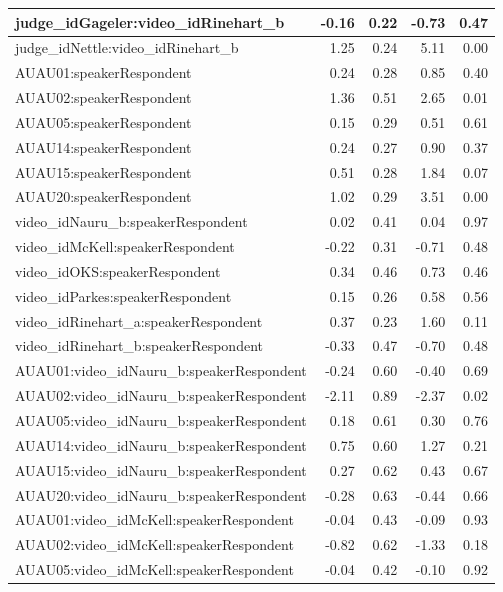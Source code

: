 \documentclass{monashthesis}
\begin{document}
\begin{tabular}{l|r|r|r|r}
\hline
judge\_idGageler:video\_idRinehart\_b & -0.16 & 0.22 & -0.73 & 0.47\\
\hline
judge\_idNettle:video\_idRinehart\_b & 1.25 & 0.24 & 5.11 & 0.00\\
\hline
AUAU01:speakerRespondent & 0.24 & 0.28 & 0.85 & 0.40\\
\hline
AUAU02:speakerRespondent & 1.36 & 0.51 & 2.65 & 0.01\\
\hline
AUAU05:speakerRespondent & 0.15 & 0.29 & 0.51 & 0.61\\
\hline
AUAU14:speakerRespondent & 0.24 & 0.27 & 0.90 & 0.37\\
\hline
AUAU15:speakerRespondent & 0.51 & 0.28 & 1.84 & 0.07\\
\hline
AUAU20:speakerRespondent & 1.02 & 0.29 & 3.51 & 0.00\\
\hline
video\_idNauru\_b:speakerRespondent & 0.02 & 0.41 & 0.04 & 0.97\\
\hline
video\_idMcKell:speakerRespondent & -0.22 & 0.31 & -0.71 & 0.48\\
\hline
video\_idOKS:speakerRespondent & 0.34 & 0.46 & 0.73 & 0.46\\
\hline
video\_idParkes:speakerRespondent & 0.15 & 0.26 & 0.58 & 0.56\\
\hline
video\_idRinehart\_a:speakerRespondent & 0.37 & 0.23 & 1.60 & 0.11\\
\hline
video\_idRinehart\_b:speakerRespondent & -0.33 & 0.47 & -0.70 & 0.48\\
\hline
AUAU01:video\_idNauru\_b:speakerRespondent & -0.24 & 0.60 & -0.40 & 0.69\\
\hline
AUAU02:video\_idNauru\_b:speakerRespondent & -2.11 & 0.89 & -2.37 & 0.02\\
\hline
AUAU05:video\_idNauru\_b:speakerRespondent & 0.18 & 0.61 & 0.30 & 0.76\\
\hline
AUAU14:video\_idNauru\_b:speakerRespondent & 0.75 & 0.60 & 1.27 & 0.21\\
\hline
AUAU15:video\_idNauru\_b:speakerRespondent & 0.27 & 0.62 & 0.43 & 0.67\\
\hline
AUAU20:video\_idNauru\_b:speakerRespondent & -0.28 & 0.63 & -0.44 & 0.66\\
\hline
AUAU01:video\_idMcKell:speakerRespondent & -0.04 & 0.43 & -0.09 & 0.93\\
\hline
AUAU02:video\_idMcKell:speakerRespondent & -0.82 & 0.62 & -1.33 & 0.18\\
\hline
AUAU05:video\_idMcKell:speakerRespondent & -0.04 & 0.42 & -0.10 & 0.92\\

\end{tabular}
\end{document}

